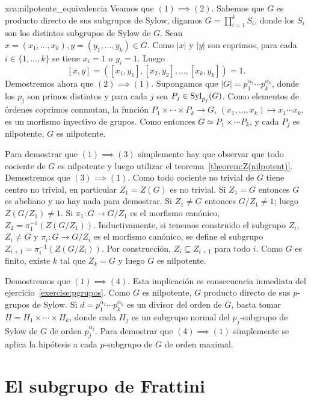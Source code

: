 \begin{sol}{xca:nilpotente_equivalencia}
	Veamos que $(1)\implies(2)$. Sabemos que $G$ es producto directo de sus
	subgrupos de Sylow, digamos $G=\prod_{i=1}^k S_i$, donde los $S_i$ son los
	distintos subgrupos de Sylow de $G$.  Sean
	$x=(x_1,\dots,x_k),y=(y_1,\dots,y_k)\in G$. Como $|x|$ y $|y|$ son
	coprimos, para cada $i\in\{1,\dots,k\}$ se tiene $x_i=1$ o $y_i=1$. Luego
	\[
		[x,y]=([x_1,y_1],[x_2,y_2],\dots,[x_k,y_k])=1. 
	\]
	Demostremos ahora que $(2)\implies(1)$. Supongamos que
	$|G|=p_1^{\alpha_1}\cdots p_k^{\alpha_k}$, donde los $p_j$ son primos
	distintos y para cada $j$ sea $P_j\in\mathrm{Syl}_{p_j}(G)$. Como elementos de
	órdenes coprimos conmutan, la función $P_1\times\cdots\times P_k\to G$,
	$(x_1,\dots,x_k)\mapsto x_1\cdots x_k$, es un morfismo inyectivo de grupos.
	Como entonces $G\simeq P_1\times\cdots P_k$, y cada $P_j$ es nilpotente,
	$G$ es nilpotente. 

	Para demostrar que $(1)\implies(3)$ simplemente hay que observar que todo
	cociente de $G$ es nilpotente y luego utilizar el
	teorema~\ref{theorem:Z(nilpotent)}. Demostremos que $(3)\implies(1)$. Como
	todo cociente no trivial de $G$ tiene centro no trivial, en particular
	$Z_1=Z(G)$ es no trivial. Si $Z_1=G$ entonces $G$ es abeliano y no hay nada
	para demostrar. Si $Z_1\ne G$ entonces $G/Z_1\ne 1$; luego $Z(G/Z_1)\ne 1$.
	Si $\pi_1\colon G\to G/Z_1$ es el morfismo canónico,
	$Z_2=\pi_1^{-1}(Z(G/Z_1))$. Inductivamente, si tenemos construido el
	subgrupo $Z_i$, $Z_i\ne G$ y  $\pi_i\colon G\to G/Z_{i}$ es el morfismo
	canónico, se define el subgrupo $Z_{i+1}=\pi_i^{-1}(Z(G/Z_i))$. Por
	construcción, $Z_i\subseteq Z_{i+1}$ para todo $i$. Como $G$ es finito,
	existe $k$ tal que $Z_k=G$ y luego $G$ es nilpotente.

	Demostremos que $(1)\implies(4)$. Esta implicación es consecuencia
	inmediata del ejercicio~\ref{exercise:pgrupos}. 
	Como $G$ es nilpotente, $G$ producto
	directo de sus $p$-grupos de Sylow. Si $d=p_1^{\alpha_1}\cdots
	p_k^{\alpha_k}$ es un divisor del orden de $G$, basta tomar
	$H=H_1\times\cdots\times H_k$, 
	donde cada $H_j$ es un subgrupo normal del $p_j$-subgrupo de Sylow de $G$
	de orden $p_j^{\alpha_j}$. Para demostrar que $(4)\implies(1)$ simplemente
	se aplica la hipótesis a cada $p$-subgrupo de $G$ de orden maximal.
\end{sol}

\section*{El subgrupo de Frattini}


